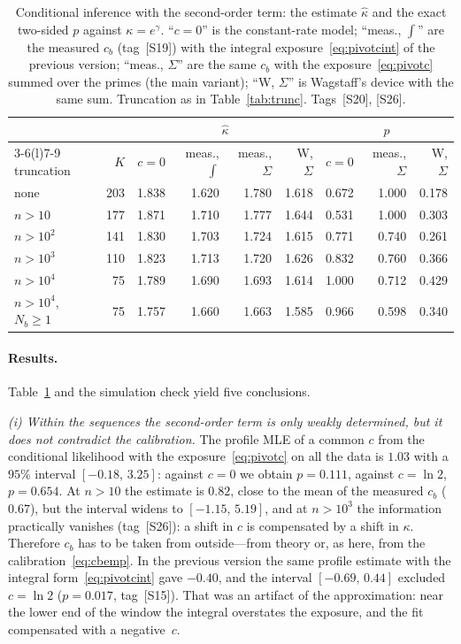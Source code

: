 \documentclass[11pt,a4paper]{article}
\theoremstyle{plain}
\theoremstyle{remark}
\newcommand{\eg}{e^{\gamma}}
\begin{document}
\begin{table}[t]
\centering
\caption{Conditional inference with the second-order term: the estimate
$\hat\kappa$ and the exact two-sided $p$ against $\kappa=\eg$. ``$c{=}0$'' is the
constant-rate model; ``meas., $\int$'' are the measured $c_b$ (tag~[S19]) with the
integral exposure~\eqref{eq:pivotcint} of the previous version; ``meas., $\Sigma$''
are the same $c_b$ with the exposure~\eqref{eq:pivotc} summed over the primes (the
main variant); ``W, $\Sigma$'' is Wagstaff's device with the same sum. Truncation
as in Table~\ref{tab:trunc}. Tags~[S20], [S26].}
\label{tab:second}
\small
\setlength{\tabcolsep}{4pt}
\begin{tabular}{lrrrrrrrr}
\toprule
& & \multicolumn{4}{c}{$\hat\kappa$} & \multicolumn{3}{c}{$p$}\\
\cmidrule(lr){3-6}\cmidrule(l){7-9}
truncation & $K$ & $c{=}0$ & meas., $\int$ & meas., $\Sigma$ & W, $\Sigma$
& $c{=}0$ & meas., $\Sigma$ & W, $\Sigma$\\
\midrule
none & 203 & 1.838 & 1.620 & 1.780 & 1.618 & 0.672 & 1.000 & 0.178\\
$n>10$ & 177 & 1.871 & 1.710 & 1.777 & 1.644 & 0.531 & 1.000 & 0.303\\
$n>10^2$ & 141 & 1.830 & 1.703 & 1.724 & 1.615 & 0.771 & 0.740 & 0.261\\
$n>10^3$ & 110 & 1.823 & 1.713 & 1.720 & 1.626 & 0.832 & 0.760 & 0.366\\
$n>10^4$ & 75 & 1.789 & 1.690 & 1.693 & 1.614 & 1.000 & 0.712 & 0.429\\
\midrule
$n>10^4$, $N_b\ge1$ & 75 & 1.757 & 1.660 & 1.663 & 1.585 & 0.966 & 0.598 & 0.340\\
\bottomrule
\end{tabular}
\end{table}

\paragraph{Results.} Table~\ref{tab:second} and the simulation check yield five
conclusions.

\emph{(i) Within the sequences the second-order term is only weakly determined,
but it does not contradict the calibration.} The profile MLE of a common $c$
from the conditional likelihood with the exposure~\eqref{eq:pivotc} on all the
data is $1.03$ with a $95\%$ interval $[-0.18,\,3.25]$: against $c=0$ we obtain
$p=0.111$, against $c=\ln2$, $p=0.654$. At $n>10$ the estimate is $0.82$, close to
the mean of the measured $c_b$ ($0.67$), but the interval widens to
$[-1.15,\,5.19]$, and
at $n>10^3$ the information practically vanishes (tag~[S26]): a shift in $c$ is
compensated by a shift in $\kappa$. Therefore $c_b$ has to be taken from
outside---from theory or, as here, from the calibration~\eqref{eq:cbemp}. In the
previous version the same profile estimate with the integral
form~\eqref{eq:pivotcint} gave $-0.40$, and the interval $[-0.69,\,0.44]$
excluded $c=\ln2$ ($p=0.017$, tag~[S15]). That was an artifact of the
approximation: near the lower end of the window the integral overstates the
exposure, and the fit compensated with a negative~$c$.
\end{document}
